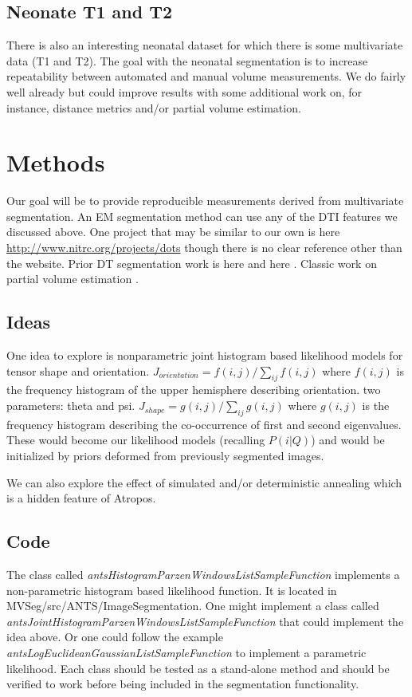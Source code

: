 \documentclass[11pt,english]{article}
\begin{document}
\subsection{Neonate T1 and T2} There is also an interesting neonatal
dataset for which there is some multivariate data (T1 and T2).  The
goal with the neonatal segmentation is to increase repeatability
between automated and manual volume measurements.  We do fairly well
already but could improve results with some additional work on, for
instance, distance metrics and/or partial volume estimation.

\section{Methods} Our goal will be to provide reproducible
measurements derived from multivariate segmentation.  An EM
segmentation method can use any of the DTI features we discussed
above.  One project that may be similar to our own is here
\url{http://www.nitrc.org/projects/dots} though there is no clear
reference other than the website.  Prior DT segmentation work is here
\citep{Lenglet2005} and here \citep{Awate2007}.  Classic work on
partial volume estimation \citep{Santago1993,Shattuck2001}.

\subsection{Ideas}
One idea to explore is nonparametric joint histogram based likelihood
models for tensor shape and orientation.  $J_{orientation} = f(i,j)/
\sum_{ij} f(i,j) $ where $f(i,j)$ is the frequency histogram of the
upper hemisphere describing orientation.  two parameters: theta and
psi.  $J_{shape} = g(i,j)/ \sum_{ij} g(i,j) $ where $g(i,j)$ is the
frequency histogram describing the co-occurrence of first and second
eigenvalues.  These would become our likelihood models (recalling
$P(i|Q)$) and would be initialized by priors deformed from previously
segmented images.

We can also explore the effect of simulated and/or deterministic
annealing which is a hidden feature of Atropos. 

\subsection{Code}
The class called {\em antsHistogramParzenWindowsListSampleFunction}
implements a non-parametric histogram based likelihood function.  It is located in MVSeg/src/ANTS/ImageSegmentation.
One might implement a class called  {\em
  antsJointHistogramParzenWindowsListSampleFunction} that could
implement the idea above.   Or one could follow the example {\em
  antsLogEuclideanGaussianListSampleFunction} to implement a
parametric likelihood.  Each class should be tested as a stand-alone
method and should be verified to work before being included in the
segmentation functionality.  
\end{document}
